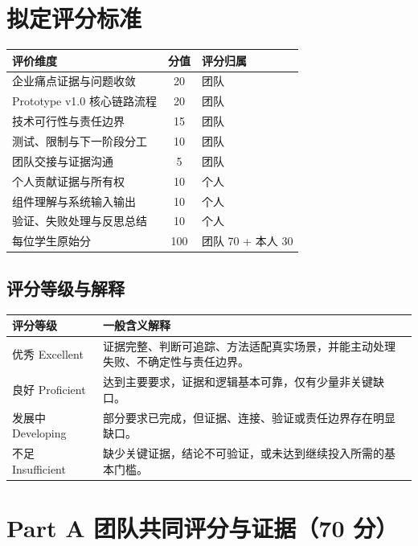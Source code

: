 \documentclass[11pt]{article}
\newcommand{\formaltable}{%
  \small
  \setlength{\tabcolsep}{5pt}%
  \renewcommand{\arraystretch}{1.2}%
  \setlength{\arrayrulewidth}{0.4pt}%
}
\renewcommand{\arraystretch}{1.2}
\begin{document}
\section{拟定评分标准}
\begin{center}
\formaltable
\begin{tabularx}{\textwidth}{|Y|c|Y|}
\hline
\textbf{评价维度} & \textbf{分值} & \textbf{评分归属} \\ \hline
企业痛点证据与问题收敛 & 20 & 团队 \\ \hline
Prototype v1.0 核心链路流程 & 20 & 团队 \\ \hline
技术可行性与责任边界 & 15 & 团队 \\ \hline
测试、限制与下一阶段分工 & 10 & 团队 \\ \hline
团队交接与证据沟通 & 5 & 团队 \\ \hline
个人贡献证据与所有权 & 10 & 个人 \\ \hline
组件理解与系统输入输出 & 10 & 个人 \\ \hline
验证、失败处理与反思总结 & 10 & 个人 \\ \hline
每位学生原始分 & 100 & 团队 70 + 本人 30 \\ \hline
\end{tabularx}
\end{center}

\subsection{评分等级与解释}
\begin{center}
\formaltable
\begin{tabularx}{\textwidth}{|l|Y|}
\hline
\textbf{评分等级} & \textbf{一般含义解释} \\ \hline
优秀 Excellent & 证据完整、判断可追踪、方法适配真实场景，并能主动处理失败、不确定性与责任边界。 \\ \hline
良好 Proficient & 达到主要要求，证据和逻辑基本可靠，仅有少量非关键缺口。 \\ \hline
发展中 Developing & 部分要求已完成，但证据、连接、验证或责任边界存在明显缺口。 \\ \hline
不足 Insufficient & 缺少关键证据，结论不可验证，或未达到继续投入所需的基本门槛。 \\ \hline
\end{tabularx}
\end{center}

\section{Part A 团队共同评分与证据（70 分）}
\end{document}
